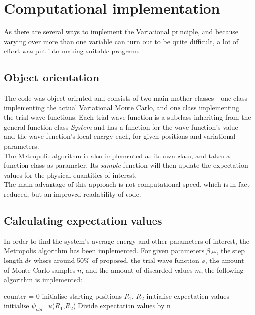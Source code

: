 \documentclass[10pt,a4paper]{article}
\begin{document}
\section{Computational implementation}
As there are several ways to implement the Variational principle, and because varying over more than one variable can turn out to be quite difficult, a lot of effort was put into making suitable programs.
\subsection{Object orientation}
The code was object oriented and consists of two main mother classes - one class implementing the actual Variational Monte Carlo, and one class implementing the trial wave functions. Each trial wave function  is a subclass inheriting from the general function-class \textit{System} and has a function for the wave function's value and the wave function's local energy each, for given positions and variational parameters.\\
The Metropolis algorithm is also implemented as its own class, and takes a function class as parameter. Its \textit{sample} function will then update the expectation values for the physical quantities of interest. \\
The main advantage of this approach is not computational speed, which is in fact reduced, but an improved readability of code.
\subsection{Calculating expectation values}
In order to find the system's average energy and other parameters of interest, the Metropolis algorithm has been implemented. 
For given parameters $\beta$,$\omega$, the step length $dr$ where around 50\% of proposed, the trial wave function $\phi$, the amount of Monte Carlo samples $n$, and the amount of discarded values $m$, the following algorithm is implemented:\\
\IncMargin{1em}
\begin{algorithm}[H]
counter = 0\;
initialise starting positions $R_1$, $R_2$\;
initialise expectation values\;
initialise $\psi_{old}$=$\psi$($R_1$,$R_2$)\;
Divide expectation values by n\; 
\end{algorithm}
\DecMargin{1em}
\end{document}
